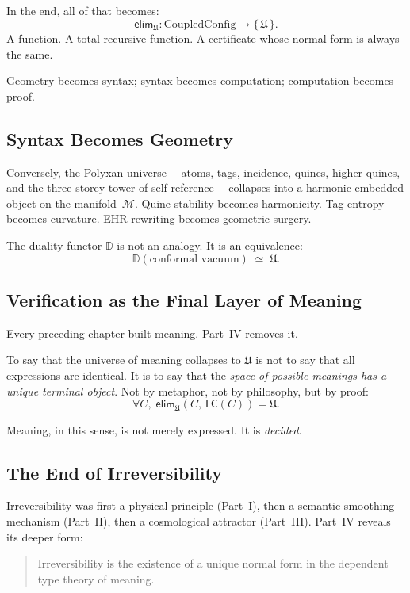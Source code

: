 In the end, all of that becomes:
\[
   \mathsf{elim}_{\mathfrak{U}} : 
      \mathrm{CoupledConfig} \to \{\, \mathfrak{U} \,\}.
\]
A function.  
A total recursive function.  
A certificate whose normal form is always the same.

Geometry becomes syntax;  
syntax becomes computation;  
computation becomes proof.

\subsection{Syntax Becomes Geometry}

Conversely, the Polyxan universe—  
atoms, tags, incidence, quines, higher quines,  
and the three-storey tower of self-reference—  
collapses into a harmonic embedded object on the manifold~$\mathcal{M}$.  
Quine-stability becomes harmonicity.  
Tag-entropy becomes curvature.  
EHR rewriting becomes geometric surgery.

The duality functor $\mathbb{D}$ is not an analogy.  
It is an equivalence:
\[
   \mathbb{D}(\text{conformal vacuum})
      \;\simeq\;
   \mathfrak{U}.
\]

\subsection{Verification as the Final Layer of Meaning}

Every preceding chapter built meaning.  
Part~IV removes it.

To say that the universe of meaning collapses to $\mathfrak{U}$  
is not to say that all expressions are identical.  
It is to say that the \emph{space of possible meanings  
has a unique terminal object}.  
Not by metaphor,  
not by philosophy,  
but by proof:
\[
   \forall C,\;
   \mathsf{elim}_{\mathfrak{U}}(C, \mathsf{TC}(C)) = \mathfrak{U}.
\]

Meaning, in this sense, is not merely expressed.  
It is \emph{decided}.

\subsection{The End of Irreversibility}

Irreversibility was first a physical principle (Part~I),  
then a semantic smoothing mechanism (Part~II),  
then a cosmological attractor (Part~III).  
Part~IV reveals its deeper form:

\begin{quote}
Irreversibility is the existence of a unique normal form  
in the dependent type theory of meaning.
\end{quote}

